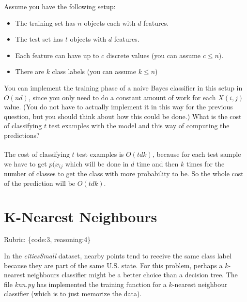 \documentclass{article}
\def\rubric#1{\gre{Rubric: \{#1\}}}{}
\def\blu#1{{\color{blu}#1}}
\def\gre#1{{\color{gre}#1}}
\def\ans#1{{\color{ans}#1}}
\def\items#1{\begin{itemize}#1\end{itemize}}
\begin{document}
Assume you have the following setup:
\items{
\item The training set has $n$ objects each with $d$ features.
\item The test set has $t$ objects with $d$ features.
\item Each feature can have up to $c$ discrete values (you can assume $c \leq n$).
\item There are $k$ class labels (you can assume $k \leq n$)
}
You can implement the training phase of a naive Bayes classifier in this setup in $O(nd)$, since you only need to do a constant amount of work for each $X(i,j)$ value. (You do not have to actually implement it in this way for the previous question, but you should think about how this could be done.)
 \blu{What is the cost of classifying $t$ test examples with the model and this way of computing the predictions?} \\ \\
\ans{
   The cost of classifying $t$ test examples is $O(tdk)$, because for each test sample we have to get
   $p(x_{ij}$ which will be done in $d$ time and then $k$ times for the number of classes to get 
   the class with more probability to be. So the whole cost of the prediction will be $O(tdk)$.
}

\section{K-Nearest Neighbours}
\rubric{code:3, reasoning:4}

In the \emph{citiesSmall} dataset, nearby points tend to receive the same class label because they are part of the same U.S. state. For this problem, perhaps a $k$-nearest neighbours classifier might be a better choice than a decision tree. The file \emph{knn.py} has implemented the training function for a $k$-nearest neighbour classifier (which is to just memorize the data).
\end{document}
